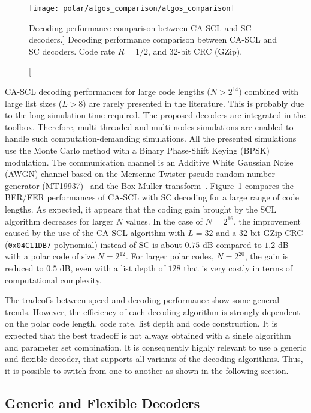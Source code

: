 \begin{figure}[htp]
  \centering
  \texttt{[image: polar/algos\_comparison/algos\_comparison]}
  \caption
    [Decoding performance comparison between CA-SCL and SC decoders.]
    {Decoding performance comparison between CA-SCL and SC decoders.
    Code rate $R = 1/2$, and 32-bit CRC (GZip).}
  \label{plot:polar_algos_comparison}
\end{figure}

CA-SCL decoding performances for large code lengths ($N > 2^{14}$) combined with
large list sizes ($L > 8$) are rarely presented in the literature. This is
probably due to the long simulation time required. The proposed decoders are
integrated in the \AFFECT toolbox. Therefore, multi-threaded and multi-nodes
simulations are enabled to handle such computation-demanding simulations. All
the presented simulations use the Monte Carlo method with a Binary Phase-Shift
Keying (BPSK) modulation. The communication channel is an Additive White
Gaussian Noise (AWGN) channel based on the Mersenne Twister pseudo-random number
generator (MT19937)~\cite{Matsumoto1998} and the Box-Muller
transform~\cite{Box1958}. Figure~\ref{plot:polar_algos_comparison} compares the
BER/FER performances of CA-SCL with SC decoding for a large range of code
lengths. As expected, it appears that the coding gain brought by the SCL
algorithm decreases for larger $N$ values. In the case of $N=2^{16}$, the
improvement caused by the use of the CA-SCL algorithm with $L=32$ and a 32-bit
GZip CRC (\verb|0x04C11DB7| polynomial) instead of SC is about $0.75$ dB
compared to $1.2$ dB with a polar code of size $N=2^{12}$. For larger polar
codes, $N=2^{20}$, the gain is reduced to $0.5$ dB, even with a list depth of
$128$ that is very costly in terms of computational complexity.

The tradeoffs between speed and decoding performance show some general trends.
However, the efficiency of each decoding algorithm is strongly dependent on the
polar code length, code rate, list depth and code construction. It is expected
that the best tradeoff is not always obtained with a single algorithm and
parameter set combination. It is consequently highly relevant to use a generic
and flexible decoder, that supports all variants of the decoding algorithms.
Thus, it is possible to switch from one to another as shown in the following
section.

\subsection{Generic and Flexible Decoders}
\label{sec:polar_genericity}

